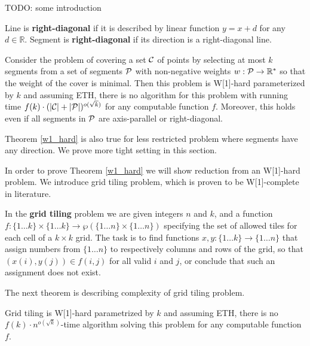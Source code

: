 TODO: some introduction

\begin{defi}
	Line is \textbf{right-diagonal} if it is
	described by linear function $y = x + d$ for any $d \in \mathbb{R}$.
	Segment is \textbf{right-diagonal} if its
	direction is a right-diagonal line.
\end{defi}

\begin{tw}
\label{w1_hard}
	Consider the problem of covering a set $\mathcal{C}$ of points
	by selecting at most $k$ segments
	from a set of segments $\mathcal{P}$ 
	with non-negative weights $w : \mathcal{P} \rightarrow \mathbb{R^*}$
	so that the weight of the cover is minimal.
	Then this problem is W[1]-hard parameterized by $k$ and
	assuming ETH, there is no algorithm for this
	problem with running time
	$f(k)\cdot(|\mathcal{C}| + |\mathcal{P}|)^{o(\sqrt{k})}$
	for any computable function $f$.
	Moreover, this holds even if all segments in $\mathcal{P}$
	are axis-parallel or right-diagonal.
\end{tw}

Theorem \ref{w1_hard} is also true for less
restricted problem where segments have any direction.
We prove more tight setting in this section.

In order to prove Theorem \ref{w1_hard}
we will show reduction from an W[1]-hard problem.
We introduce grid tiling problem, which is proven
to be W[1]-complete in literature.

\begin{defi}
In the \textbf{grid tiling} problem we are given integers $n$ and $k$,
and a function
$f : \{1 \ldots k\} \times \{1 \ldots k\} \rightarrow \wp(\{1 \ldots n\} \times \{1 \ldots n\})$
specifying the set of allowed tiles for each cell of a $k \times k$ grid.
The task is to find functions
$x,y : \{1 \ldots k\} \rightarrow \{1 \ldots n\}$
that assign numbers from $\{1 \ldots n\}$
to respectively columns and rows of the grid,
so that $(x(i), y(j)) \in f(i, j)$ for all valid $i$ and $j$,
or conclude that such an assignment does not exist.
\end{defi}

The next theorem is describing complexity of grid tiling problem.

\begin{tw}
\label{grid_tiling_w1_hard}
Grid tiling is W[1]-hard parametrized by $k$ and
assuming ETH, there is no $f(k)\cdot n^{o(\sqrt{k})}$-time
algorithm solving this problem
for any computable function $f$.
\end{tw}

